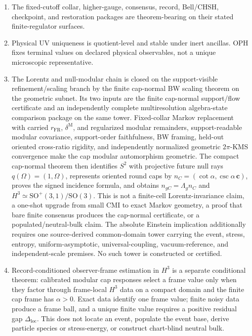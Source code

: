\begin{enumerate}[leftmargin=2em]
\item The fixed-cutoff collar, higher-gauge, consensus, record, Bell/CHSH, checkpoint, and
restoration packages are theorem-bearing on their stated finite-regulator surfaces.
\item Physical UV uniqueness is quotient-level and stable under inert ancillas. OPH fixes terminal
values on declared physical observables, not a unique microscopic representative.
\item The Lorentz and null-modular chain is closed on the support-visible refinement/scaling
branch by the finite cap-normal BW scaling theorem on the geometric subnet. Its two inputs are the
finite cap-normal support/flow certificate and an independently complete
multiresolution algebra-state comparison package on the same tower. Fixed-collar
Markov replacement with carried \(r_{\mathrm{FR}}\), \(\delta^{\mathrm M}\), and regularized
modular remainders, support-readable modular covariance, support-order faithfulness, BW framing,
held-out oriented cross-ratio rigidity, and independently normalized geometric \(2\pi\)-KMS
convergence make the cap modular automorphism geometric. The compact cap-normal theorem then
identifies \(S^2\) with projective future null rays \(q(\Omega)=(1,\Omega)\), represents
oriented round caps by \(n_C=(\cot\alpha,\csc\alpha\,\mathbf c)\), proves the signed incidence
formula, and obtains \(n_{gC}=\Lambda_gn_C\) and
\(H^3\simeq\mathrm{SO}^+(3,1)/\mathrm{SO}(3)\). This is not a finite-cell
Lorentz-invariance claim, a one-shot upgrade from small CMI to exact Markov geometry, a proof
that bare finite consensus produces the cap-normal certificate, or a populated/neutral-bulk
claim. The absolute Einstein implication additionally requires one
source-derived common-domain tower carrying the event, stress, entropy,
uniform-asymptotic, universal-coupling, vacuum-reference, and independent-scale
premises. No such tower is constructed or certified.
\item Record-conditioned observer-frame estimation in \(H^3\) is a separate conditional theorem:
calibrated modular cap responses select a frame value only when they factor through frame-local
\(H^3\) data on a compact domain and the finite cap frame has \(\alpha>0\). Exact data identify one
frame value; finite noisy data produce a frame ball, and a unique finite value requires a positive
residual gap \(\Delta_{\mathrm{loc}}\). This does not locate an event, populate the event base,
derive particle species or stress-energy, or construct chart-blind neutral bulk.

\end{enumerate}
